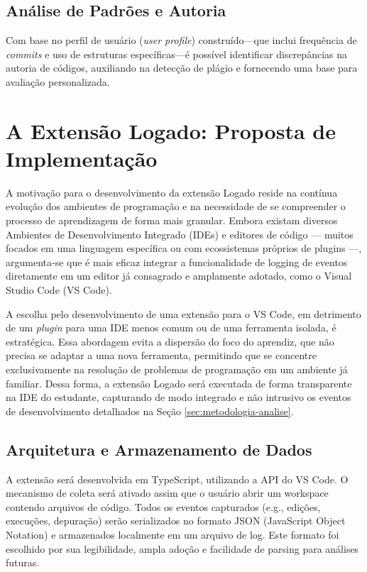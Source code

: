 \subsection{Análise de Padrões e Autoria}
Com base no perfil de usuário (\textit{user profile}) construído—que inclui frequência de \textit{commits} e uso de estruturas específicas—é possível identificar discrepâncias na autoria de códigos, auxiliando na detecção de plágio e fornecendo uma base para avaliação personalizada.

\section{A Extensão Logado: Proposta de Implementação}
\label{sec:extensao-logado}
A motivação para o desenvolvimento da extensão Logado reside na contínua evolução dos ambientes de programação e na necessidade de se compreender o processo de aprendizagem de forma mais granular. Embora existam diversos Ambientes de Desenvolvimento Integrado (IDEs) e editores de código — muitos focados em uma linguagem específica ou com ecossistemas próprios de plugins —, argumenta-se que é mais eficaz integrar a funcionalidade de logging de eventos diretamente em um editor já consagrado e amplamente adotado, como o Visual Studio Code (VS Code).

A escolha pelo desenvolvimento de uma extensão para o VS Code, em detrimento de um \textit{plugin} para uma IDE menos comum ou de uma ferramenta isolada, é estratégica. Essa abordagem evita a dispersão do foco do aprendiz, que não precisa se adaptar a uma nova ferramenta, permitindo que se concentre exclusivamente na resolução de problemas de programação em um ambiente já familiar. Dessa forma, a extensão Logado será executada de forma transparente na IDE do estudante, capturando de modo integrado e não intrusivo os eventos de desenvolvimento detalhados na Seção \ref{sec:metodologia-analise}.

\subsection{Arquitetura e Armazenamento de Dados}
\label{subsec:arquitetura-armazenamento}

A extensão será desenvolvida em TypeScript, utilizando a API do VS Code. O mecanismo de coleta será ativado assim que o usuário abrir um workspace contendo arquivos de código. Todos os eventos capturados (e.g., edições, execuções, depuração) serão serializados no formato JSON (JavaScript Object Notation) e armazenados localmente em um arquivo de log. Este formato foi escolhido por sua legibilidade, ampla adoção e facilidade de parsing para análises futuras.

